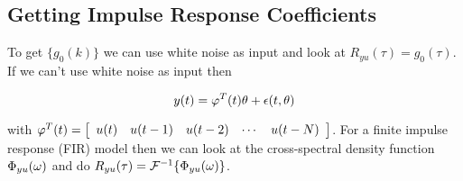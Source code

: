 \subsection{Getting Impulse Response Coefficients}
To get $\{g_0(k)\}$ we can use white noise as input and look at $R_{yu}(\tau)=g_0(\tau)$.
If we can't use white noise as input then

\begin{equation*}
y(t) = \varphi^T(t)\theta+\epsilon(t,\theta)
\end{equation*}

with $\varphi^T(t) = \left[\begin{array}{c c c c c} u(t) & u(t-1) & u(t-2) & \cdots & u(t-N) \end{array}\right]$.
For a finite impulse response (FIR) model then we can look at the cross-spectral density function $\Phi_{yu} (\omega)$ and do $R_{yu} (\tau) = \mathcal{F}^{-1}\{\Phi_{yu} (\omega)\}$.%
